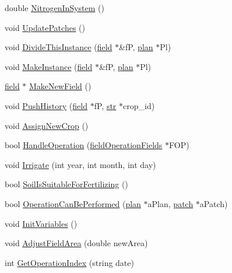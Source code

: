 \begin{DoxyCompactItemize}
\item 
double \hyperlink{classfield_ab9b2bfaedcd8a6421f4533160c6b4a80}{NitrogenInSystem} ()
\item 
void \hyperlink{classfield_ad57b5d59bb4168a4f642c6490bedc001}{UpdatePatches} ()
\item 
void \hyperlink{classfield_ad2d1131c9c208b90868ab13d9f87ceed}{DivideThisInstance} (\hyperlink{classfield}{field} $\ast$\&fP, \hyperlink{classplan}{plan} $\ast$Pl)
\item 
void \hyperlink{classfield_aa5c556bd1ec5b80a42441d0ac4a65f4c}{MakeInstance} (\hyperlink{classfield}{field} $\ast$\&fP, \hyperlink{classplan}{plan} $\ast$Pl)
\item 
\hyperlink{classfield}{field} $\ast$ \hyperlink{classfield_a4d3c3f8c50e61befbbda998cc4a7437d}{MakeNewField} ()
\item 
void \hyperlink{classfield_a51e15b1581712c50d383f2c64a3cc203}{PushHistory} (\hyperlink{classfield}{field} $\ast$fP, \hyperlink{classfield_a6f1744c3ac290d5fc0ef66302c0ec632}{str} $\ast$crop\_\-id)
\item 
void \hyperlink{classfield_acd79798ce9ab3f64c895e48c622e8f0b}{AssignNewCrop} ()
\item 
bool \hyperlink{classfield_a0609f721e5761c23529f1f08f785a264}{HandleOperation} (\hyperlink{classfield_operation_fields}{fieldOperationFields} $\ast$FOP)
\item 
void \hyperlink{classfield_abd51d3a66f0da4571963d53197e84914}{Irrigate} (int year, int month, int day)
\item 
bool \hyperlink{classfield_aae3221ddc530c2211f8092b00d175c02}{SoilIsSuitableForFertilizing} ()
\item 
bool \hyperlink{classfield_a7ee560523f2f9f9f12ede3c2fba4b064}{OperationCanBePerformed} (\hyperlink{classplan}{plan} $\ast$aPlan, \hyperlink{classpatch}{patch} $\ast$aPatch)
\item 
void \hyperlink{classfield_a001ff179927c8ead0f12d1dc04628ead}{InitVariables} ()
\item 
void \hyperlink{classfield_adde20822cfc7a99c9ed35b831353bcbb}{AdjustFieldArea} (double newArea)
\item 
int \hyperlink{classfield_adc362e0bae809a3134164c4f66ef36d4}{GetOperationIndex} (string date)
\end{DoxyCompactItemize}
